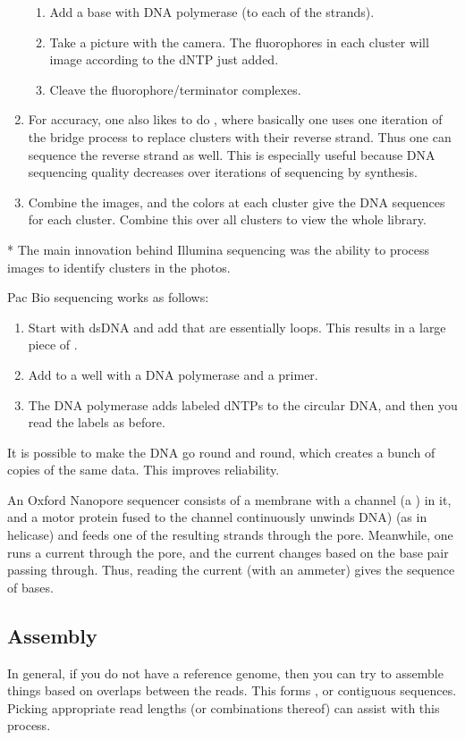 \begin{exm}
\begin{enumerate}
			\begin{enumerate}
				\item Add a base with DNA polymerase (to each of the strands).
				\item Take a picture with the camera. The fluorophores in each cluster will image according to the dNTP just added.
				\item Cleave the fluorophore/terminator complexes.
			\end{enumerate}
		\item For accuracy, one also likes to do , where basically one uses one iteration of the bridge process to replace clusters with their reverse strand. Thus one can sequence the reverse strand as well. This is especially useful because DNA sequencing quality decreases over iterations of sequencing by synthesis.
		\item Combine the images, and the colors at each cluster give the DNA sequences for each cluster. Combine this over all clusters to view the whole library.
	\end{enumerate}
\end{exm}

\begin{fact}*
	The main innovation behind Illumina sequencing was the ability to process images to identify clusters in the photos.
\end{fact}

\begin{exm}
	Pac Bio sequencing works as follows:
	\begin{enumerate}
		\item Start with dsDNA and add  that are essentially loops. This results in a large piece of .
		\item Add to a well with a DNA polymerase and a primer. 
		\item The DNA polymerase adds labeled dNTPs to the circular DNA, and then you read the labels as before.
	\end{enumerate}
	It is possible to make the DNA go round and round, which creates a bunch of copies of the same data. This improves reliability.
\end{exm}

\begin{exm}
	An Oxford Nanopore sequencer consists of a membrane with a channel (a ) in it, and a motor protein fused to the channel continuously unwinds DNA) (as in helicase) and feeds one of the resulting strands through the pore. Meanwhile, one runs a current through the pore, and the current changes based on the base pair passing through. Thus, reading the current (with an ammeter) gives the sequence of bases.
\end{exm}

\subsection{Assembly}

In general, if you do not have a reference genome, then you can try to assemble things based on overlaps between the reads. 
This forms , or contiguous sequences. Picking appropriate read lengths (or combinations thereof) can assist with this process.
